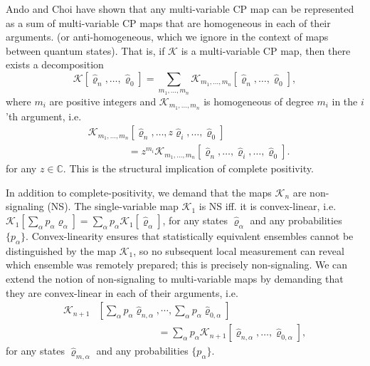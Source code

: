 \documentclass[
    11pt,
    letterpaper,
    reprint,
    notitlepage,
    superscriptaddress,
    aps,prx
]{revtex4-2}
\renewcommand{\mathbb}{\mathds}	%
\renewcommand{\rho}{\varrho}
\newcommand{\K}{\mathcal{K}}
\begin{document}
Ando and Choi \cite{AndChoi86} have shown that any multi-variable CP map
can be represented as a sum of multi-variable CP maps that are homogeneous in each of their arguments.
(or anti-homogeneous, which we ignore in the context of maps between quantum states).
That is, if $\K$ is a multi-variable CP map, then there exists a decomposition
\begin{equation}\label{eq:CPdecomposition}
	\K[\hat \rho_n,\ldots, \hat \rho_0] = \sum_{m_1, \ldots, m_n} \K_{m_1, \ldots, m_n}[\hat \rho_n,\ldots, \hat \rho_0],
\end{equation}
where $m_i$ are positive integers and $\K_{m_1, \ldots, m_n}$ is homogeneous
of degree $m_i$ in the $i$'th argument, i.e. 
\begin{equation}\label{eq:CPhomogeneity}
\begin{split}
	&\K_{m_1, \ldots, m_n}[\hat \rho_n,\ldots, z \hat \rho_i, \ldots, \hat \rho_0]\\ 
	&\qquad\qquad = z^{m_i} \K_{m_1, \ldots, m_n}[\hat \rho_n,\ldots, \hat \rho_i, \ldots, \hat \rho_0].
\end{split}
\end{equation}
for any $z \in \mathbb{C}$. 
This is the structural implication of complete positivity.

In addition to complete-positivity, we demand that the maps $\K_n$ are non-signaling (NS).
The single-variable map $\K_1$ is NS \cite{Ghir88,Gisin89,SimGis01} iff.
it is convex-linear, i.e. 
$\mathcal{K}_1[\sum_\alpha p_\alpha \hat{\rho}_\alpha] = \sum_\alpha p_\alpha 
\mathcal{K}_1[\hat{\rho}_\alpha]$, for any states $\hat{\rho}_\alpha$ and any probabilities 
$\{p_\alpha\}$. 
Convex-linearity ensures that statistically equivalent ensembles cannot 
be distinguished by the map $\K_1$, so no subsequent local measurement 
can reveal which ensemble was remotely prepared; this is precisely non-signaling.
We can 
extend the notion of non-signaling to multi-variable maps by demanding that they are convex-linear
in each of their arguments, i.e.
\begin{equation}\label{eq:ConvexLinearity}
\begin{split}
	\K_{n+1}&\left[\sum_\alpha p_\alpha \hat{\rho}_{n,\alpha}, \cdots, 
	\sum_\alpha p_\alpha \hat{\rho}_{0,\alpha}\right]\\ 
	&\qquad \qquad\qquad= \sum_\alpha p_\alpha \K_{n+1}[\hat{\rho}_{n,\alpha}, \ldots, \hat{\rho}_{0,\alpha}],
\end{split}
\end{equation}
for any states $\hat{\rho}_{m,\alpha}$ and any probabilities $\{p_\alpha\}$. 
\end{document}
